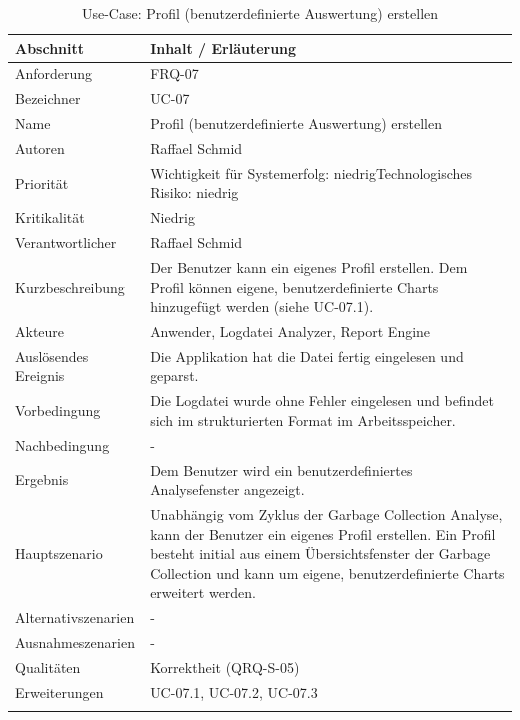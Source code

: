 \begin{longtable}{|p{4cm}|p{10.5cm}|}
\hline
   \textbf{Abschnitt} & \textbf{Inhalt / Erläuterung} \\\hline
   Anforderung & FRQ-07\\\hline
   Bezeichner & UC-07\\\hline
   Name &Profil (benutzerdefinierte Auswertung) erstellen\\\hline
   Autoren & Raffael Schmid\\\hline
   Priorität & Wichtigkeit für Systemerfolg: niedrig\newline Technologisches Risiko: niedrig\\\hline
   Kritikalität & Niedrig\\\hline
   Verantwortlicher & Raffael Schmid\\\hline
   Kurzbeschreibung & Der Benutzer kann ein eigenes Profil erstellen. Dem Profil können eigene, benutzerdefinierte Charts hinzugefügt werden (siehe UC-07.1).\\\hline
   Akteure & Anwender, Logdatei Analyzer, Report Engine\\\hline
   Auslösendes Ereignis & Die Applikation hat die Datei fertig eingelesen und geparst.\\\hline
   Vorbedingung & Die Logdatei wurde ohne Fehler eingelesen und befindet sich im strukturierten Format im Arbeitsspeicher.\\\hline
   Nachbedingung & -\\\hline
   Ergebnis & Dem Benutzer wird ein benutzerdefiniertes Analysefenster angezeigt.\\\hline
   Hauptszenario & Unabhängig vom Zyklus der Garbage Collection Analyse, kann der Benutzer ein eigenes Profil erstellen. Ein Profil besteht initial aus einem Übersichtsfenster der Garbage Collection und kann um eigene, benutzerdefinierte Charts erweitert werden.\\\hline
   Alternativszenarien & -\\\hline
   Ausnahmeszenarien & -\\\hline
   Qualitäten & Korrektheit (QRQ-S-05)\\\hline
   Erweiterungen & UC-07.1, UC-07.2, UC-07.3\\\hline

\caption{Use-Case: Profil (benutzerdefinierte Auswertung) erstellen }
\end{longtable}


